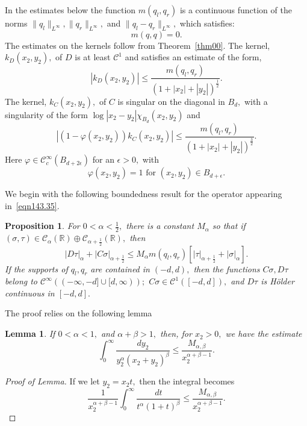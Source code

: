 \documentclass[11pt]{article}
\newcommand{\Bk}{\color{black}}
\newcommand{\Rd}{\color{black}}
\newcommand\cC{\mathcal{C}}
\newcommand\bbR{\mathbb R}
\newtheorem{proposition}{Proposition}
\newtheorem{lemma}{Lemma}
\theoremstyle{definition}
\theoremstyle{remark}
\begin{document}
   In the estimates below the function $m(q_l,q_r)$ is a continuous function of
   the norms $\|q_l\|_{L^{\infty}},\|q_r\|_{L^{\infty}},$ and
   $\|q_l-q_r\|_{L^{\infty}},$ which satisfies:
   \begin{equation}
     m(q,q)=0.
   \end{equation}
   The estimates on the kernels follow from Theorem~\ref{thm00}.
   The kernel, $k_D(x_2,y_2),$ of $D$ is at least $\cC^1$ and satisfies an
   estimate of the form,
   \begin{equation}
     |k_D(x_2,y_2)|\leq \frac{m(q_l,q_r)}{(1+|x_2|+|y_2|)^{\frac 12}}.
   \end{equation}
   The kernel, $k_C(x_2,y_2),$ of $C$ is singular on the diagonal in $B_d,$ with
   a singularity of the form $\log|x_2-y_2|\chi_{B_d}(x_2,y_2)$ and
   \begin{equation}
     |(1-\varphi(x_2,y_2))k_C(x_2,y_2)|\leq
     \frac{m(q_l,q_r)}{(1+|x_2|+|y_2|)^{\frac 32}}.
   \end{equation}
   Here $\varphi\in\cC^{\infty}_{c}(B_{d+2\epsilon})$ for an $\epsilon>0,$ with
   \begin{equation}
     \varphi(x_2,y_2)=
           1\text{ for }(x_2,y_2)\in B_{d+\epsilon}.
   \end{equation}
  
   

  We begin with the following boundedness result for the operator
   appearing in~\eqref{eqn143.35}.
 \begin{proposition}\label{prop1}
   For $0<\alpha<\frac 12,$ there is a constant $M_{\alpha}$ so that
   if $(\sigma,\tau)\in\cC_{\alpha}(\bbR)\oplus\cC_{\alpha+\frac 12}(\bbR),$ then
   \begin{equation}\label{eqn153.06}
     |D\tau|_{\alpha}+|C\sigma|_{\alpha+\frac 12}\leq M_{\alpha}
     m(q_l,q_r)\left[ |\tau|_{\alpha+\frac 12}+|\sigma|_{\alpha}\right].
   \end{equation}
  \Rd  If the supports of $q_l, q_r$ are contained in $(-d,d),$ then the functions
  $C\sigma, D\tau$ belong to $\cC^{\infty}((-\infty,-d]\cup [d,\infty));$
      $C\sigma\in\cC^1([-d,d]),$ and $D\tau$ is H\"older continuous in $[-d,d].$ \Bk
 \end{proposition}

 The proof relies on the following lemma
 \begin{lemma}\label{lem1.0}
   If $0<\alpha<1,$ and $\alpha+\beta>1,$ then, for $x_2>0,$ we have
   the estimate
   \begin{equation}
     \int_{0}^{\infty}\frac{dy_2}{y_2^{\alpha}(x_2+y_2)^{\beta}}\leq \frac{M_{\alpha,\beta}}{x_2^{\alpha+\beta-1}}.
   \end{equation}
   \end{lemma}
   \begin{proof}[Proof of Lemma]
     If we let $y_2=x_2 t,$ then the integral becomes
     \begin{equation}
       \frac{1}{x_2^{\alpha+\beta-1}}\int_{0}^{\infty}\frac{dt}{t^{\alpha}(1+t)^{\beta}}
       \leq \frac{M_{\alpha,\beta}}{x_2^{\alpha+\beta-1}}.
     \end{equation}
   \end{proof}
 
\end{document}
